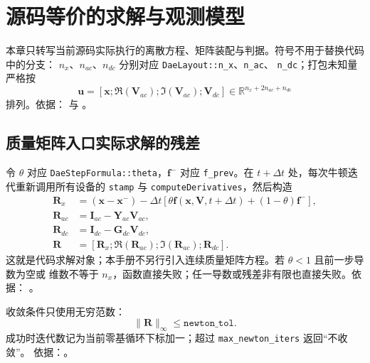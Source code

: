 \section{源码等价的求解与观测模型}
\label{sec:dynamics-source-equivalent}

本章只转写当前源码实际执行的离散方程、矩阵装配与判据。符号不用于替换代码中的分支：
$n_x$、$n_{ac}$、$n_{dc}$ 分别对应 \texttt{DaeLayout::n\_x}、\texttt{n\_ac}、
\texttt{n\_dc}；打包未知量严格按
\begin{equation}
 \mathbf u=[\mathbf x;\Re(\mathbf V_{ac});\Im(\mathbf V_{ac});\mathbf V_{dc}]
 \in\mathbb R^{n_x+2n_{ac}+n_{dc}}
\end{equation}
排列。依据： 与
。

\subsection{质量矩阵入口实际求解的残差}
令 $\theta$ 对应 \texttt{DaeStepFormula::theta}，$\mathbf f^{-}$ 对应
\texttt{f\_prev}。在 $t+\Delta t$ 处，每次牛顿迭代重新调用所有设备的
\texttt{stamp} 与 \texttt{computeDerivatives}，然后构造
\begin{align}
 \mathbf R_x &=(\mathbf x-\mathbf x^{-})-\Delta t
 \left[\theta\mathbf f(\mathbf x,\mathbf V,t+\Delta t)
 +(1-\theta)\mathbf f^{-}\right],\\
 \mathbf R_{ac} &=\mathbf I_{ac}-\mathbf Y_{ac}\mathbf V_{ac},\\
 \mathbf R_{dc} &=\mathbf I_{dc}-\mathbf G_{dc}\mathbf V_{dc},\\
 \mathbf R&=[\mathbf R_x;\Re(\mathbf R_{ac});\Im(\mathbf R_{ac});\mathbf R_{dc}].
\end{align}
这就是代码求解对象；本手册不另行引入连续质量矩阵方程。若 $\theta<1$ 且前一步导数为空或
维数不等于 $n_x$，函数直接失败；任一导数或残差非有限也直接失败。依据：
。

收敛条件只使用无穷范数：
\begin{equation}
 \|\mathbf R\|_\infty\leq\texttt{newton\_tol}.
\end{equation}
成功时迭代数记为当前零基循环下标加一；超过 \texttt{max\_newton\_iters} 返回“不收敛”。
依据：。

